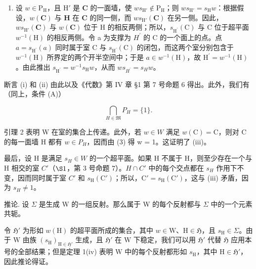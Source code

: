 \begin{enumerate}
\def\labelenumi{(\Alph{enumi})}
\setcounter{enumi}{2}
\tightlist
\item
设 \(w \in \mathrm{P_H}\)，且 \(\mathrm{H}'\) 是 \(\mathbf{C}\) 的一面墙，使 \(ws_{\mathrm{H}'} \notin \mathrm{P_H}\)；则 \(ws_{\mathrm{H}'} = s_{\mathrm{H}}w\)：根据假设，\(w(\mathbf{C})\) 与 \(\mathbf{H}\) 在 \(\mathbf{C}\) 的同一侧，而 \(ws_{\mathrm{H}'}(\mathbf{C})\) 在另一侧。因此，\(ws_{\mathrm{H}'}(\mathbf{C})\) 与 \(w(\mathbf{C})\) 位于 H 的相反两侧；所以，\(s_{\mathrm{H}^{\prime}}(\mathrm{C})\) 与 C 位于超平面 \(w^{-1}(\mathrm{H})\) 的相反两侧。令 a 为支撑为 \(H^{\prime}\) 的 C 的一个面上的点。点 \(a = s_{\mathrm{H}^{\prime}}(a)\) 同时属于室 C 与 \(s_{\mathrm{H}^{\prime}}(\mathrm{C})\) 的闭包，而这两个室分别包含于 \(w^{-1}(\mathrm{H})\) 所界定的两个开半空间中；于是 \(a \in w^{-1}(\mathrm{H})\)，故 \(\mathrm{H}^{\prime} = w^{-1}(\mathrm{H})\)。由此推出 \(s_{\mathrm{H}^{\prime}} = w^{-1}s_{\mathrm{H}}w\)，从而 \(ws_{H^{\prime}} = s_{H}w\)。
\end{enumerate}

断言 (i) 和 (ii) 由此以及《代数》第 IV 章 §1 第 7 号命题 6 得出。此外，我们有（同上，条件 (A)）

\[
\bigcap_ {H \in \mathfrak {M}} P _ {H} = \{1 \}.\tag{3}
\]

引理 2 表明 W 在室的集合上传递。此外，若 \(w \in W\) 满足 \(w(\mathrm{C}) = \mathrm{C}\)，则对 C 的每一面墙 H 都有 \(w \in P_{H}\)，因而由 (3) 得 w = 1。这证明了 (iii)。

最后，设 H 是满足 \(s_{H} \in W\) 的一个超平面。如果 H 不属于 H，则至少存在一个与 H 相交的室 \(C'\)（\(\S1\)，第 3 号命题 7）。\(H \cap C'\) 中的每个交点都在 \(s_{H}\) 作用下不变，因而同时属于室 \(C'\) 和 \(s_{\mathrm{H}}(\mathrm{C}')\)；所以，\(\mathrm{C}' = s_{\mathrm{H}}(\mathrm{C}')\)，这与 (iii) 矛盾，因为 \(s_{H} \neq 1\)。

推论. 设 \(\Sigma\) 是生成 W 的一组反射。那么属于 W 的每个反射都与 \(\Sigma\) 中的一个元素共轭。

令 \(\mathfrak{H}'\) 为形如 \(w(\mathrm{H})\) 的超平面所成的集合，其中 \(w \in \mathrm{W}\)、\(\mathrm{H} \in \mathfrak{H}\)，且 \(s_{\mathrm{H}} \in \Sigma\)。由于 \(\mathrm{W}\) 由族 \((s_{\mathrm{H}})_{\mathrm{H} \in \mathfrak{H}'}\) 生成，且 \(\mathfrak{H}'\) 在 \(\mathrm{W}\) 下稳定，我们可以用 \(\mathfrak{H}'\) 代替 \(\mathfrak{H}\) 应用本号的全部结果；但是定理 1(iv) 表明 \(\mathrm{W}\) 中的每个反射都形如 \(s_{\mathrm{H}}\)，其中 \(\mathrm{H} \in \mathfrak{H}'\)，因此推论得证。


